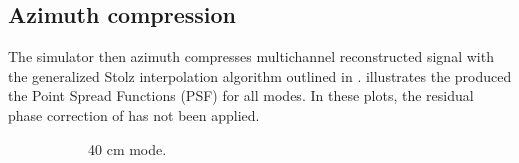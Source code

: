\subsection{Azimuth compression}
The simulator then azimuth compresses multichannel reconstructed signal with the generalized Stolz interpolation algorithm outlined in .  illustrates the produced the Point Spread Functions (PSF) for all modes. In these plots, the residual phase correction of  has not been applied.
\begin{figure}[ht!]
\begin{subfigure}{0.5\textwidth}
\begin{center}
 \caption{40 cm mode.}
 \label{fg:40cmPSF}
 \end{center}
\end{subfigure}
\begin{subfigure}{0.5\textwidth}
\begin{center}

\end{center}
\end{subfigure}
\end{figure}
